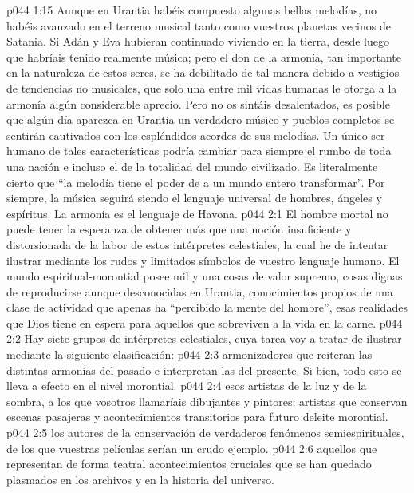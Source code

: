 \vs p044 1:15 Aunque en Urantia habéis compuesto algunas bellas melodías, no habéis avanzado en el terreno musical tanto como vuestros planetas vecinos de Satania. Si Adán y Eva hubieran continuado viviendo en la tierra, desde luego que habríais tenido realmente música; pero el don de la armonía, tan importante en la naturaleza de estos seres, se ha debilitado de tal manera debido a vestigios de tendencias no musicales, que solo una entre mil vidas humanas le otorga a la armonía algún considerable aprecio. Pero no os sintáis desalentados, es posible que algún día aparezca en Urantia un verdadero músico y pueblos completos se sentirán cautivados con los espléndidos acordes de sus melodías. Un único ser humano de tales características podría cambiar para siempre el rumbo de toda una nación e incluso el de la totalidad del mundo civilizado. Es literalmente cierto que “la melodía tiene el poder de a un mundo entero transformar”. Por siempre, la música seguirá siendo el lenguaje universal de hombres, ángeles y espíritus. La armonía es el lenguaje de Havona.
\vs p044 2:1 El hombre mortal no puede tener la esperanza de obtener más que una noción insuficiente y distorsionada de la labor de estos intérpretes celestiales, la cual he de intentar ilustrar mediante los rudos y limitados símbolos de vuestro lenguaje humano. El mundo espiritual\hyp{}morontial posee mil y una cosas de valor supremo, cosas dignas de reproducirse aunque desconocidas en Urantia, conocimientos propios de una clase de actividad que apenas ha “percibido la mente del hombre”, esas realidades que Dios tiene en espera para aquellos que sobreviven a la vida en la carne.
\vs p044 2:2 \pc Hay siete grupos de intérpretes celestiales, cuya tarea voy a tratar de ilustrar mediante la siguiente clasificación:
\vs p044 2:3  armonizadores que reiteran las distintas armonías del pasado e interpretan las del presente. Si bien, todo esto se lleva a efecto en el nivel morontial.
\vs p044 2:4  esos artistas de la luz y de la sombra, a los que vosotros llamaríais dibujantes y pintores; artistas que conservan escenas pasajeras y acontecimientos transitorios para futuro deleite morontial.
\vs p044 2:5  los autores de la conservación de verdaderos fenómenos semiespirituales, de los que vuestras películas serían un crudo ejemplo.
\vs p044 2:6  aquellos que representan de forma teatral acontecimientos cruciales que se han quedado plasmados en los archivos y en la historia del universo.
